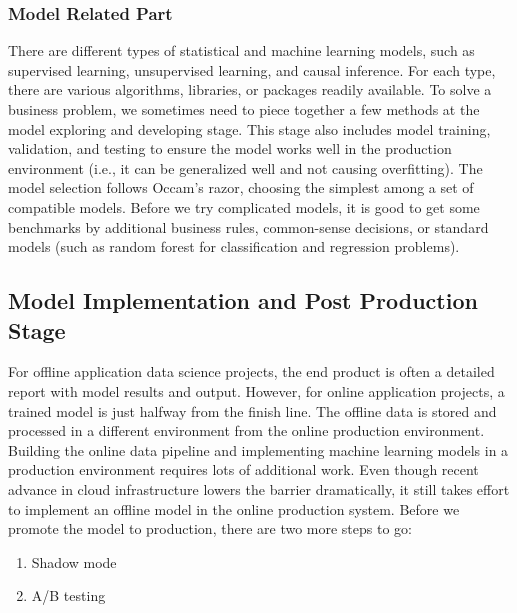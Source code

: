 \documentclass[
  12pt,
]{krantz}
\providecommand{\tightlist}{%
  \setlength{\itemsep}{0pt}\setlength{\parskip}{0pt}}
\begin{document}
\hypertarget{model-related-part}{%
\subsubsection{Model Related Part}\label{model-related-part}}

There are different types of statistical and machine learning models, such as supervised learning, unsupervised learning, and causal inference. For each type, there are various algorithms, libraries, or packages readily available. To solve a business problem, we sometimes need to piece together a few methods at the model exploring and developing stage. This stage also includes model training, validation, and testing to ensure the model works well in the production environment (i.e., it can be generalized well and not causing overfitting). The model selection follows Occam's razor, choosing the simplest among a set of compatible models. Before we try complicated models, it is good to get some benchmarks by additional business rules, common-sense decisions, or standard models (such as random forest for classification and regression problems).

\hypertarget{ModelImplementationandPostProductionStage}{%
\subsection{Model Implementation and Post Production Stage}\label{ModelImplementationandPostProductionStage}}

For offline application data science projects, the end product is often a detailed report with model results and output. However, for online application projects, a trained model is just halfway from the finish line. The offline data is stored and processed in a different environment from the online production environment. Building the online data pipeline and implementing machine learning models in a production environment requires lots of additional work. Even though recent advance in cloud infrastructure lowers the barrier dramatically, it still takes effort to implement an offline model in the online production system. Before we promote the model to production, there are two more steps to go:

\begin{enumerate}
\def\labelenumi{\arabic{enumi}.}
\tightlist
\item
  Shadow mode
\item
  A/B testing
\end{enumerate}
\end{document}
